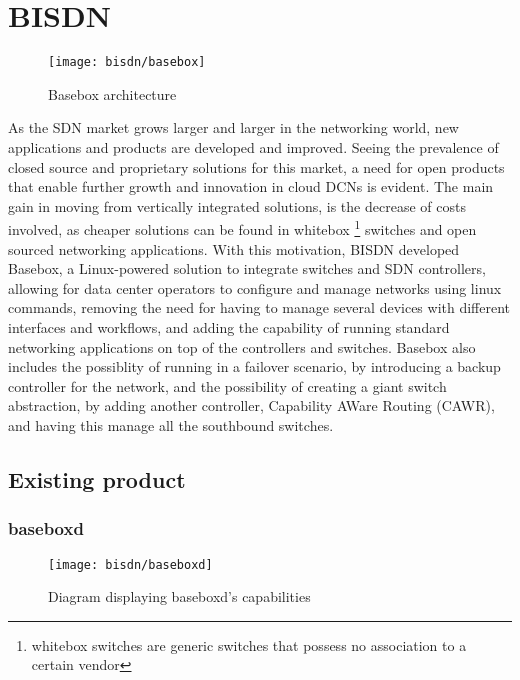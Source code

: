 \section {BISDN} \label{chap:bisdn} %

\begin{figure} [!htbp]
    \centering
    \texttt{[image: bisdn/basebox]}
    \caption{Basebox architecture}
\end{figure}

As the SDN market grows larger and larger in the networking world, new applications and products are developed and improved. Seeing the prevalence of closed source
and proprietary solutions for this market, a need for open products that enable further growth and innovation in cloud DCNs is evident. The main gain in moving from 
vertically integrated solutions, is the decrease of costs involved, as cheaper solutions can be found in whitebox \footnote {whitebox switches are generic switches
that possess no association to a certain vendor} switches and open sourced networking applications. With this motivation, BISDN developed Basebox, a Linux-powered
solution to integrate switches and SDN controllers, allowing for data center  operators to configure and manage networks using linux commands, removing the need for
having to manage several devices with different interfaces and workflows, and adding the capability of running standard networking applications on top of the 
controllers and switches. Basebox also includes the possiblity of running in a failover scenario, by introducing a backup controller for the network, and the
possibility of creating a giant switch abstraction, by adding another controller, Capability AWare Routing (CAWR), and having this manage all the southbound switches.

\subsection {Existing product}

\subsubsection {baseboxd}

\begin{figure} [!htbp]
    \centering
    \texttt{[image: bisdn/baseboxd]}
    \caption{Diagram displaying baseboxd's capabilities\cite{bisdn_gmbh_software_2017}}
\end{figure}

